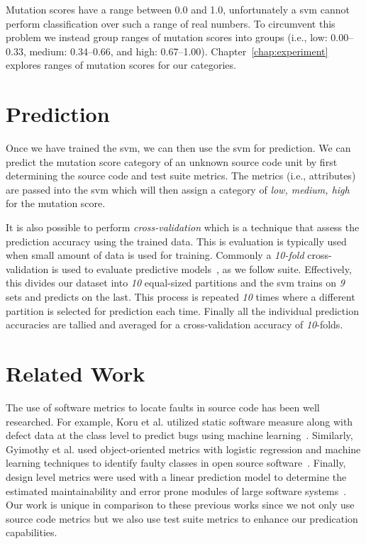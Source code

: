 Mutation scores have a range between 0.0 and 1.0, unfortunately a \gls{svm} cannot perform classification over such a range of real numbers. To circumvent this problem we instead group ranges of mutation scores into groups (i.e., low: 0.00--0.33, medium: 0.34--0.66, and high: 0.67--1.00). Chapter~\ref{chap:experiment} explores ranges of mutation scores for our categories.


\section{Prediction}
\label{sec:approach_prediction}
Once we have trained the \gls{svm}, we can then use the \gls{svm} for prediction. We can predict the mutation score category of an unknown source code unit by first determining the source code and test suite metrics. The metrics (i.e., attributes) are passed into the \gls{svm} which will then assign a category of \textit{low, medium, high} for the mutation score.

It is also possible to perform \emph{cross-validation} which is a technique that assess the prediction accuracy using the trained data. This is evaluation is typically used when small amount of data is used for training. Commonly a \emph{10-fold} cross-validation is used to evaluate predictive models~\cite{Koh95}, as we follow suite. Effectively, this divides our dataset into \emph{10} equal-sized partitions and the \gls{svm} trains on \emph{9} sets and predicts on the last. This process is repeated \emph{10} times where a different partition is selected for prediction each time. Finally all the individual prediction accuracies are tallied and averaged for a cross-validation accuracy of \emph{10}-folds.


\section{Related Work}
\label{sec:approach_related_work}
The use of software metrics to locate faults in source code has been well researched. For example, Koru et al. utilized static software measure along with defect data at the class level to predict bugs using machine learning~\cite{KL05}. Similarly, Gyimothy et al. used object-oriented metrics with logistic regression and machine learning techniques to identify faulty classes in open source software~\cite{GFS05}. Finally, design level metrics were used with a linear prediction model to determine the estimated maintainability and error prone modules of large software systems~\cite{MKPS00}. Our work is unique in comparison to these previous works since we not only use source code metrics but we also use test suite metrics to enhance our predication capabilities.
